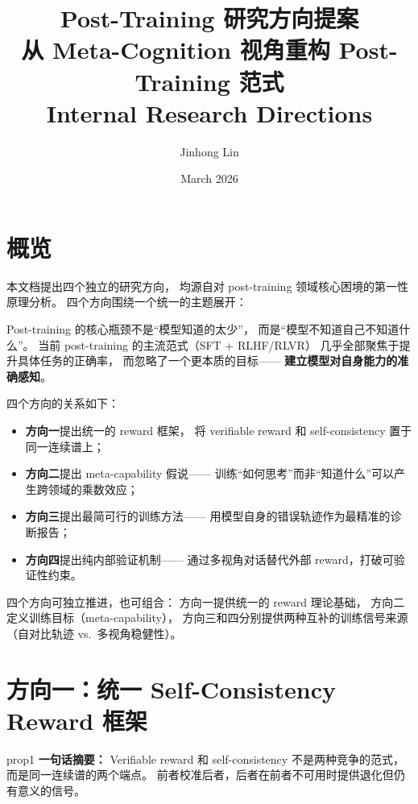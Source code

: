 \documentclass[12pt,a4paper]{article}
\title{\textbf{Post-Training 研究方向提案}\\
\large{从 Meta-Cognition 视角重构 Post-Training 范式}\\[6pt]
\normalsize{Internal Research Directions}}
\author{Jinhong Lin}
\date{March 2026}
\begin{document}
\maketitle

\section*{概览}

本文档提出四个独立的研究方向，
均源自对 post-training 领域核心困境的第一性原理分析。
四个方向围绕一个统一的主题展开：

\begin{insightbox}
Post-training 的核心瓶颈不是``模型知道的太少''，
而是``模型不知道自己不知道什么''。
当前 post-training 的主流范式（SFT + RLHF/RLVR）
几乎全部聚焦于提升具体任务的正确率，
而忽略了一个更本质的目标——
\textbf{建立模型对自身能力的准确感知}。
\end{insightbox}

\noindent
四个方向的关系如下：
\begin{itemize}[leftmargin=2em]
  \item \textbf{方向一}提出统一的 reward 框架，
    将 verifiable reward 和 self-consistency 置于同一连续谱上；
  \item \textbf{方向二}提出 meta-capability 假说——
    训练``如何思考''而非``知道什么''可以产生跨领域的乘数效应；
  \item \textbf{方向三}提出最简可行的训练方法——
    用模型自身的错误轨迹作为最精准的诊断报告；
  \item \textbf{方向四}提出纯内部验证机制——
    通过多视角对话替代外部 reward，打破可验证性约束。
\end{itemize}

\noindent
四个方向可独立推进，也可组合：
方向一提供统一的 reward 理论基础，
方向二定义训练目标（meta-capability），
方向三和四分别提供两种互补的训练信号来源
（自对比轨迹 vs.\ 多视角稳健性）。

\newpage

\section{方向一：统一 Self-Consistency Reward 框架}
\label{sec:prop1}

\begin{proposalbox}{prop1}
\textbf{一句话摘要：}
Verifiable reward 和 self-consistency 不是两种竞争的范式，
而是同一连续谱的两个端点。
前者校准后者，后者在前者不可用时提供退化但仍有意义的信号。
\end{proposalbox}
\end{document}
